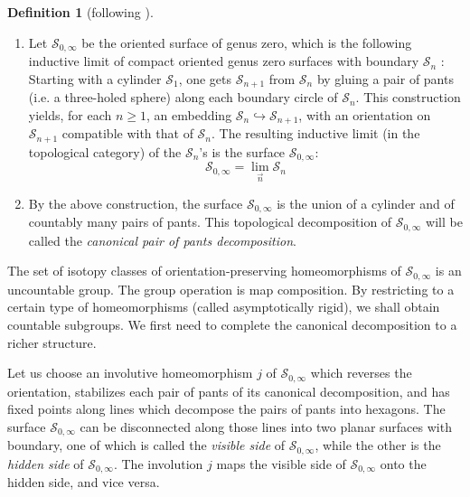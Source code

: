 \documentclass[twoside]{irmaems}
\theoremstyle{plain}
\theoremstyle{definition}
\newtheorem{definition}{Definition}[section]
\theoremstyle{remark}
\begin{document}
\begin{definition}[following \cite{ka-se}]
\begin{enumerate}
\item Let  $\mathscr{S}_{0,\infty}$ be the oriented surface of genus zero, 
which is the following  inductive limit of compact oriented genus zero surfaces with boundary 
$\mathscr{S}_{n}$ : Starting with a cylinder $\mathscr{S}_{1}$, one gets $\mathscr{S}_{n+1}$ from 
 $\mathscr{S}_{n}$ by gluing a pair of pants  (i.e. a three-holed sphere) along 
 each boundary circle of $\mathscr{S}_{n}$. This construction yields, for each $n\geq 1$, an embedding 
  $\mathscr{S}_{n}\hookrightarrow \mathscr{S}_{n+1}$, 
  with an orientation on $\mathscr{S}_{n+1}$ compatible with that of  $\mathscr{S}_{n}$. 
  The resulting inductive limit (in the topological category) of the $\mathscr{S}_{n}$'s is the surface
   $\mathscr{S}_{0,\infty}$: $$\mathscr{S}_{0,\infty}={\displaystyle \lim_{\stackrel{\rightarrow}{n}} \mathscr{S}_{n}}$$
  
\item By the above construction, the surface $\mathscr{S}_{0,\infty}$ is the union of a cylinder and of countably many 
pairs of pants.  This topological decomposition of  $\mathscr{S}_{0,\infty}$
will be called the {\em canonical pair of pants decomposition}. 
\end{enumerate}


\end{definition}


\vspace{0.1cm}\noindent 
The set of isotopy classes of  orientation-preserving  homeomorphisms  of $\mathscr{S}_{0,\infty}$ 
is an uncountable group. The group operation is map composition. 
By restricting to a certain type of homeomorphisms (called asymptotically rigid),
we shall obtain countable subgroups. We first need to complete the canonical decomposition to a richer structure.

\vspace{0.1cm}\noindent 
Let us choose an involutive homeomorphism $j$ of $\mathscr{S}_{0,\infty}$ which reverses the 
orientation, stabilizes 
each pair of pants of its canonical decomposition, and has fixed points along lines which decompose the pairs of pants into hexagons.
The surface $\mathscr{S}_{0,\infty}$ can be disconnected along those lines into two planar surfaces with boundary, one of which is called the {\em visible side} of 
$\mathscr{S}_{0,\infty}$, while the other is the {\em hidden side} of $\mathscr{S}_{0,\infty}$. The involution $j$ maps the visible side of $\mathscr{S}_{0,\infty}$ 
onto the hidden side, and vice versa.
\end{document}

